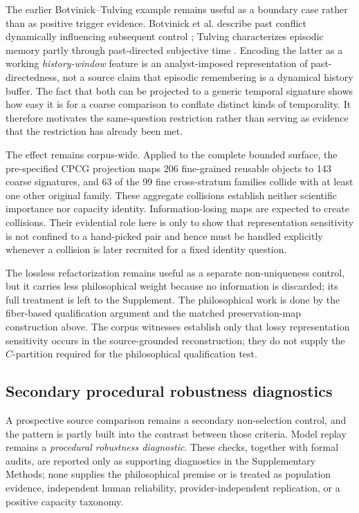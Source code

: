 \documentclass[11pt]{article}
\begin{document}
The earlier Botvinick--Tulving example remains useful as a boundary case rather than as positive trigger evidence. Botvinick et al. describe past conflict dynamically influencing subsequent control \citep{BotvinickEtAl2001ConflictMonitoring}; Tulving characterizes episodic memory partly through past-directed subjective time \citep{Tulving2002EpisodicMemory}. Encoding the latter as a working \emph{history-window} feature is an analyst-imposed representation of past-directedness, not a source claim that episodic remembering is a dynamical history buffer. The fact that both can be projected to a generic temporal signature shows how easy it is for a coarse comparison to conflate distinct kinds of temporality. It therefore motivates the same-question restriction rather than serving as evidence that the restriction has already been met.

The effect remains corpus-wide. Applied to the complete bounded surface, the pre-specified CPCG projection maps 206 fine-grained reusable objects to 143 coarse signatures, and 63 of the 99 fine cross-stratum families collide with at least one other original family. These aggregate collisions establish neither scientific importance nor capacity identity. Information-losing maps are expected to create collisions. Their evidential role here is only to show that representation sensitivity is not confined to a hand-picked pair and hence must be handled explicitly whenever a collision is later recruited for a fixed identity question.

The lossless refactorization remains useful as a separate non-uniqueness control, but it carries less philosophical weight because no information is discarded; its full treatment is left to the Supplement. The philosophical work is done by the fiber-based qualification argument and the matched preservation-map construction above. The corpus witnesses establish only that lossy representation sensitivity occurs in the source-grounded reconstruction; they do not supply the \(C\)-partition required for the philosophical qualification test.
\subsection{Secondary procedural robustness diagnostics}

A prospective source comparison remains a secondary non-selection control, and the pattern is partly built into the contrast between those criteria. Model replay remains a \emph{procedural robustness diagnostic}. These checks, together with formal audits, are reported only as supporting diagnostics in the Supplementary Methods; none supplies the philosophical premise or is treated as population evidence, independent human reliability, provider-independent replication, or a positive capacity taxonomy.
\end{document}
